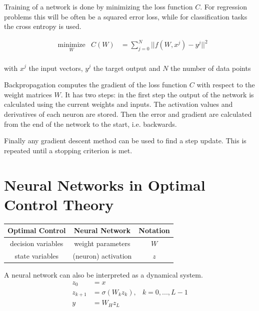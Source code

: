 Training of a network is done by minimizing the loss function $C$. For regression problems this will be often be a squared error loss, while for classification tasks the cross entropy is used.

\begin{equation*}
\begin{aligned}
& \underset{W}{\text{minimize}}
& C(W) &= \sum\limits_{j=0}^{N}||f(W,x^j) - y^j||^2 \\
\end{aligned}
\end{equation*}

with $x^j$ the input vectors, $y^j$ the target output and $N$ the number of data points

Backpropagation computes the gradient of the loss function $C$ with respect to the weight matrices $W$. It has two steps: in the first step the output of the network is calculated using the current weights and inputs. The activation values and derivatives of each neuron are stored. Then the error and gradient are calculated from the end of the network to the start, i.e. backwards.

Finally any gradient descent method can be used to find a step update. This is repeated until a stopping criterion is met.


\section{Neural Networks in Optimal Control Theory}

\begin{table}
\begin{tabular}{c | c | c }
Optimal Control & Neural Network & Notation\\ \hline
decision variables & weight parameters & $W$\\
state variables & (neuron) activation & $z$\\
\end{tabular}
\end{table}

A neural network can also be interpreted as a dynamical system.
\begin{equation*}
	\begin{aligned}
	z_0 &= x \\
	z_{k+1} &= \sigma(W_kz_k), & k = 0,...,L-1 \\
	y &= W_Hz_L \\
	\end{aligned}
\end{equation*}

